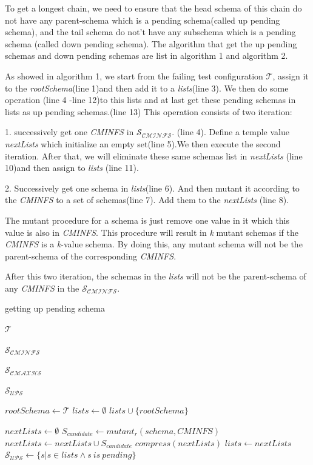 \documentclass[10pt,journal,cspaper,compsoc]{IEEEtran}
\begin{document}
To get a longest chain, we need to ensure that the head schema of this chain do not have any parent-schema which is a pending schema(called up pending schema), and the tail schema do not't have any subschema which is a pending schema (called down pending schema). The algorithm that get the up pending schemas and down pending schemas are list in algorithm 1 and algorithm 2.

As showed in algorithm 1, we start from the failing test configuration $\mathcal{T}$, assign it to the \emph{rootSchema}(line 1)and then add it to a \emph{lists}(line 3). We then do some operation (line 4 -line 12)to this lists and at last get these pending schemas in lists as up pending schemas.(line 13)  This operation consists of two iteration:

1. successively get one \emph{CMINFS} in $\mathcal{S_{CMINFS}}$. (line 4). Define a temple value \emph{nextLists} which initialize an empty set(line 5).We then execute the second iteration. After that, we will eliminate these same schemas list in \emph{nextLists} (line 10)and then assign to \emph{lists} (line 11).

2. Successively get one schema in \emph{lists}(line 6). And then mutant it according to the \emph{CMINFS} to a set of schemas(line 7). Add them to the  \emph{nextLists} (line 8).

The mutant procedure for a schema is just remove one value in it which this value is also in \emph{CMINFS}. This procedure will result in \emph{k} mutant schemas if the \emph{CMINFS} is a \emph{k}-value schema. By doing this, any mutant schema will not be the parent-schema of the corresponding \emph{CMINFS}.

After this two iteration, the schemas in the \emph{lists} will not be the parent-schema of any \emph{CMINFS} in the $\mathcal{S_{CMINFS}}$.

\begin{algorithm}
  \caption{getting up pending schema}
  \begin{algorithmic}[1]
     \Require  $\mathcal{T}$ 

     $\mathcal{S_{CMINFS}}$ 

     $\mathcal{S_{CMAXHS}}$ 

     \Ensure  $\mathcal{S_{UPS}}$ 

    \Statex{}
    \State $rootSchema \leftarrow \mathcal{T}$
    \State $lists \leftarrow \emptyset$
    \State $lists \cup \{rootSchema\}$

     \State $nextLists \leftarrow \emptyset$
        \State$S_{candidate} \leftarrow mutant_{r}(schema,CMINFS)$
        \State $nextLists \leftarrow nextLists \cup S_{candidate}$
     \EndFor
     \State $compress(nextLists)$
     \State $lists \leftarrow nextLists$
    \EndFor
     \State $\mathcal{S_{UPS}} \leftarrow   \{ s | s \in lists \wedge {s\ is\ pending}\}$
  \end{algorithmic}
\end{algorithm}
\end{document}
